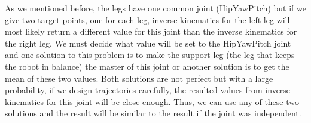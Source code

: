 As we mentioned before, the legs have one common joint (HipYawPitch) but if we give two target points, one for each leg, inverse kinematics for the left leg will most likely  return a different value for this joint than the inverse kinematics for the right leg. We must decide what value will be set to the HipYawPitch joint and one solution to this problem is to make the support leg (the leg that keeps the robot in balance) the master of this joint or another solution is to get the mean of these two values. Both solutions are not perfect but with a large probability, if we design trajectories carefully, the resulted values from inverse kinematics for this joint will be close enough. Thus, we can use any of these two solutions and the result will be similar to the result if the joint was independent.